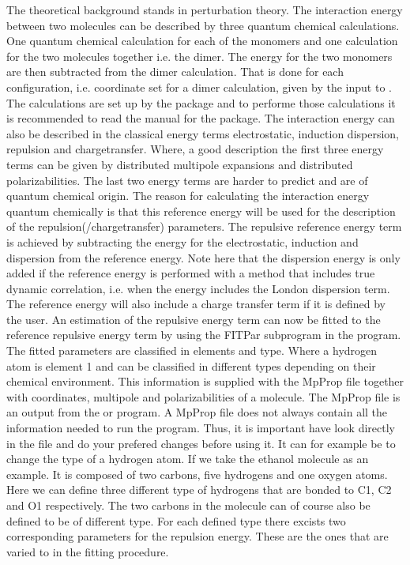 The theoretical background stands in perturbation theory. The interaction
energy between two molecules can be described by three quantum chemical
calculations. One quantum chemical calculation for each of the monomers
and one calculation for the two molecules together i.e. the dimer. The
energy for the two monomers are then subtracted from the dimer
calculation. That is done for each configuration, i.e. coordinate set
for a dimer calculation, given by the input to .
The calculations are set up by the  package and to
performe those calculations it is recommended to read the manual for
the  package. The interaction energy can also be
described in the classical energy terms electrostatic, induction dispersion,
repulsion and chargetransfer. Where, a good description the first three
energy terms can be given by distributed multipole expansions and distributed
polarizabilities. The last two energy terms are harder to predict and
are of quantum chemical origin. The reason for calculating the interaction
energy quantum chemically is that this reference energy will be used for
the description of the repulsion(/chargetransfer) parameters. The repulsive
reference energy term is achieved by subtracting the energy for the electrostatic,
induction and dispersion from the reference energy. Note here that the
dispersion energy is only added if the reference energy is performed
with a method that includes true dynamic correlation, i.e. when the energy
includes the London dispersion term. The reference energy will also include
a charge transfer term if it is defined by the user. An estimation of the
repulsive energy term can now be fitted to the reference repulsive energy
term by using the FITPar subprogram in the  program. The
fitted parameters are classified in elements and type. Where a hydrogen
atom is element 1 and can be classified in different types depending on
their chemical environment. This information is supplied with the MpProp
file together with coordinates, multipole and polarizabilities of a
molecule. The MpProp file is an output from the  or
 program. A MpProp file does not always contain all the
information needed to run the  program. Thus, it is important
have look directly in the file and do your prefered changes before using
it. It can for example be to change the type of a hydrogen atom. If we
take the ethanol molecule as an example. It is composed of two carbons,
five hydrogens and one oxygen atoms. Here we can define three different
type of hydrogens that are bonded to C1, C2 and O1 respectively. The two
carbons in the molecule can of course also be defined to be of different
type. For each defined type there excists two corresponding parameters for
the repulsion energy. These are the ones that are varied to in the fitting
procedure.

